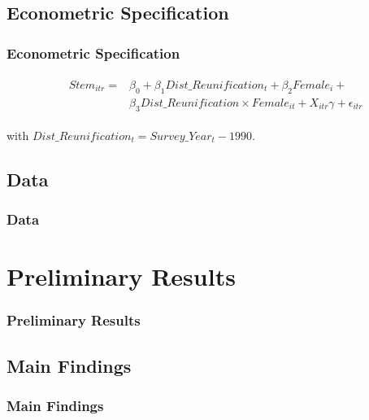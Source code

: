 \documentclass[11pt, aspectratio=1610, xcolor={dvipsnames}]{beamer}
\begin{document}
	\subsection{Econometric Specification}
	\begin{frame}
		\frametitle{Econometric Specification}
		
			{\normalsize
				\begin{align}
					&\begin{aligned}
						\label{eq:spec}
						Stem_{itr} =& \beta_{0} + \beta_{1} Dist\_Reunification_{t} + \beta_{2} Female_{i} +\\
						&\beta_{3} Dist\_Reunification \times Female_{it} + X_{itr} \gamma + \epsilon_{itr}
					\end{aligned}
				\end{align}
				
				\vspace{1cm}
				
				\hspace{6.2em} with $Dist\_Reunification_{t} = Survey\_Year_{t} - 1990$.
			}
		
	\end{frame}
	
	\subsection{Data}
	\begin{frame}
		\frametitle{Data}
	\end{frame}
	
	\begin{frame}
		\frametitle{}
	\end{frame}
	
	\section{Preliminary Results}
	\begin{frame}
		\frametitle{Preliminary Results}
	\end{frame}
	
	\begin{frame}
		\frametitle{}
	\end{frame}
	
	\subsection{Main Findings}
	\begin{frame}
		\frametitle{Main Findings}
	\end{frame}
	
\end{document}

